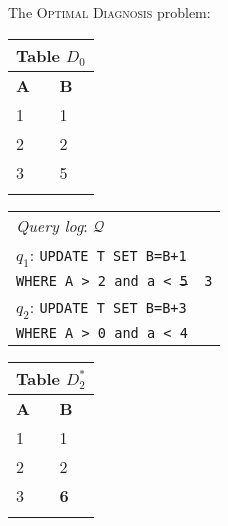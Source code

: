 \documentclass{vldb}
\newcounter{prob}
\begin{document}
\begin{figure}[t]
The \textsc{Optimal Diagnosis} problem:\\
    \begin{minipage}[t]{0.1\textwidth}
         \vspace{0pt} 
         \centering
        \begin{tabular}{ll}
            \multicolumn{2}{l}{Table $D_0$}\\
            \toprule
            \textbf{A}  & \textbf{B}\\
            \midrule
			 1 & 1 \\
			 2 & 2 \\
			 3 & 5 \\
            \bottomrule
            \\
        \end{tabular}
    \end{minipage}
    \begin{minipage}[t]{0.2\textwidth}
         \vspace{0pt} 
         \centering
        \begin{tabular}{p{26ex}}
            \multicolumn{1}{l}{\emph{Query log}: $\mathcal{Q}$}\\
            $q_1$: \texttt{\small UPDATE T SET B=B+1}\\
            \texttt{\small WHERE A > 2 and a < \sout{5} {\color{red} 3}} \\
            $q_2$: \texttt{\small UPDATE T SET B=B+3}\\
                  \texttt{\small WHERE A > 0 and a < 4} \\
        \end{tabular}
    \end{minipage}
    \begin{minipage}[t]{0.16\textwidth}
         \vspace{0pt} 
         \centering
        \begin{tabular}{ll}
            \multicolumn{2}{l}{Table $D_2^*$}\\
            \toprule
            \textbf{A}  & \textbf{B}\\
            \midrule
			 1 & 1 \\
			 2 & 2 \\
			 3 & {\textbf{6}} \\
            \bottomrule
            \\
        \end{tabular}
    \end{minipage}

\end{figure}
\end{document}
